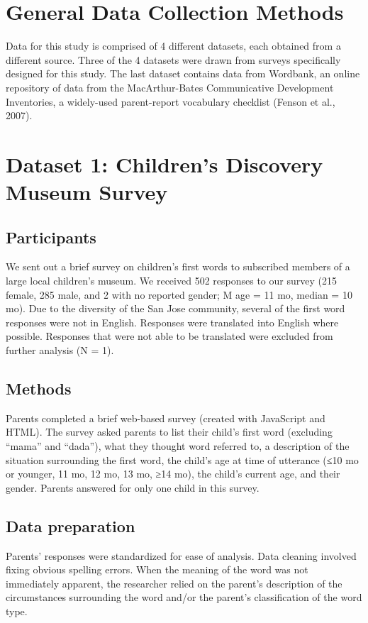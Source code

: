 \documentclass[10pt,letterpaper]{article}
\begin{document}
\section{General Data Collection Methods}
Data for this study is comprised of 4 different datasets, each obtained from a different source. Three of the 4 datasets were drawn from surveys specifically designed for this study. The last dataset contains data from Wordbank, an online repository of data from the MacArthur-Bates Communicative Development Inventories, a widely-used parent-report vocabulary checklist (Fenson et al., 2007). 

\section{Dataset 1: Children's Discovery Museum Survey}

\subsection{Participants}
We sent out a brief survey on children’s first words to subscribed members of a large local children’s museum. We received 502 responses to our survey (215 female, 285 male, and 2 with no reported gender; M age = 11 mo, median = 10 mo). Due to the diversity of the San Jose community, several of the first word responses were not in English. Responses were translated into English where possible. Responses that were not able to be translated were excluded from further analysis (N = 1).

\subsection{Methods}
Parents completed a brief web-based survey (created with JavaScript and HTML). The survey asked parents to list their child’s first word (excluding “mama” and “dada”), what they thought word referred to, a description of the situation surrounding the first word, the child’s age at time of utterance (≤10 mo or younger, 11 mo, 12 mo, 13 mo, ≥14 mo), the child’s current age, and their gender. Parents answered for only one child in this survey.

\subsection{Data preparation}
Parents’ responses were standardized for ease of analysis. Data cleaning involved fixing obvious spelling errors. When the meaning of the word was not immediately apparent, the researcher relied on the parent’s description of the circumstances surrounding the word and/or the parent’s classification of the word type.
\end{document}
